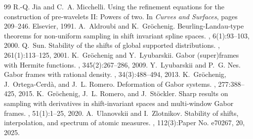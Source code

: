 \documentclass[10pt,a4paper]{amsart}
\numberwithin{equation}{section}
\begin{document}
\begin{thebibliography}{99}
 R.-Q. Jia and C.~A. Micchelli. \newblock Using the refinement equations for the construction of pre-wavelets {II}: Powers of two. \newblock In {\em Curves and Surfaces}, pages 209--246. Elsevier, 1991.
 A.~Aldroubi and K.~Gr\"ochenig. \newblock Beurling-{L}andau-type theorems for non-uniform sampling in shift invariant spline spaces. , 6(1):93--103, 2000.
 Q.~Sun. \newblock Stability of the shifts of global supported distributions. , 261(1):113--125, 2001.
 K.~Gr\"{o}chenig and Y.~Lyubarskii. \newblock Gabor (super)frames with {H}ermite functions. , 345(2):267--286, 2009.
 Y.~Lyubarskii and P.~G. Nes. \newblock Gabor frames with rational density. , 34(3):488--494, 2013.
 K.~Gr\"{o}chenig, J.~Ortega-Cerd\`a, and J.~L. Romero. \newblock Deformation of {G}abor systems. , 277:388--425, 2015.
 K.~Gr\"ochenig, J.~L. Romero, and J.~St\"ockler. \newblock Sharp results on sampling with derivatives in shift-invariant spaces and multi-window {G}abor frames. , 51(1):1--25, 2020.
 A.~Ulanovskii and I.~Zlotnikov. \newblock Stability of shifts, interpolation, and spectrum of atomic measures. , 112(3):Paper No. e70267, 20, 2025.
\end{thebibliography}
\end{document}
